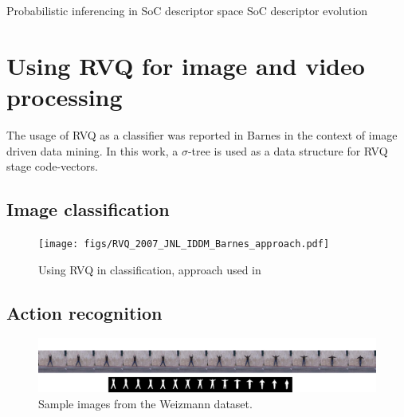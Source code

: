 \documentclass[12pt,letterpaper,doublespaced,ETD]{gt-ece-thesis} %
\begin{document}
\begin{Body}
Probabilistic inferencing in SoC descriptor space
SoC descriptor evolution



\chapter{Using RVQ for image and video processing}
\label{chap_RVQ_images}	

The usage of RVQ as a classifier was reported in Barnes \cite{2007_JNL_IDDM_Barnes} in the context of image driven data mining.  In this work, a $\sigma$-tree is used as a data structure for RVQ stage code-vectors.
\section{Image classification}
\label{app:RVQ_2007_JNL_IDDM_Barnes_approach}	

\begin{figure}[htp!]
\centering
\texttt{[image: figs/RVQ\_2007\_JNL\_IDDM\_Barnes\_approach.pdf]}
\caption{Using RVQ in classification, approach used in \cite{2007_JNL_Katrina_Barnes,2007_JNL_IDDM_Barnes}}
\label{fig:RVQ_2007_JNL_IDDM_Barnes_approach}
\end{figure}


\section{Action recognition}


\begin{figure}		
\centering		
\includegraphics[width=1.0\textwidth]{figs/Proposal_fig5_RVQ_HMM_Weizmann_dataset}	
\caption{Sample images from the Weizmann dataset.}
\label{fig:Weizmann_sequence}
\end{figure}


\end{Body}
\end{document}
